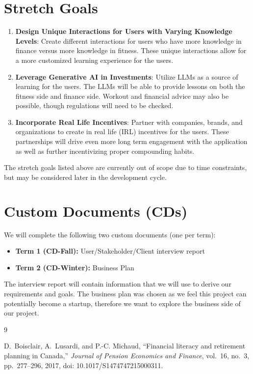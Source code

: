 \documentclass{article}
\begin{document}
\section{Stretch Goals}
\label{sec:stretch}

\begin{enumerate}
    \item \textbf{Design Unique Interactions for Users with Varying Knowledge Levels}: Create different interactions for users who have more knowledge in finance versus more knowledge in fitness.
    These unique interactions allow for a more customized learning experience for the users.
    \item \textbf{Leverage Generative AI in Investments}: Utilize LLMs as a source of learning for the users.
    The LLMs will be able to provide lessons on both the fitness side and finance side.
    Workout and financial advice may also be possible, though regulations will need to be checked.
    \item \textbf{Incorporate Real Life Incentives}: Partner with companies, brands, and organizations to create in real life (IRL) incentives for the users.
    These partnerships will drive even more long term engagement with the application as well as further incentivizing proper compounding habits.
\end{enumerate}
The stretch goals listed above are currently out of scope due to time constraints, but may be considered later in the development cycle.

\section{Custom Documents (CDs)}

We will complete the following two custom documents (one per term):

\begin{itemize}
\item \textbf{Term 1 (CD-Fall):} User/Stakeholder/Client interview report
\item \textbf{Term 2 (CD-Winter):} Business Plan
\end{itemize}

The interview report will contain information that we will use to derive our requirements and goals. The business plan was chosen as we feel this project can potentially become a startup, therefore we want to explore the business side of our project.

\begin{thebibliography}{9}

D.~Boisclair, A.~Lusardi, and P.-C. Michaud, ``Financial literacy and
retirement planning in Canada,'' \emph{Journal of Pension Economics and
Finance}, vol.~16, no.~3, pp.~277--296, 2017,
doi: 10.1017/S1474747215000311.

\end{thebibliography}
\end{document}
